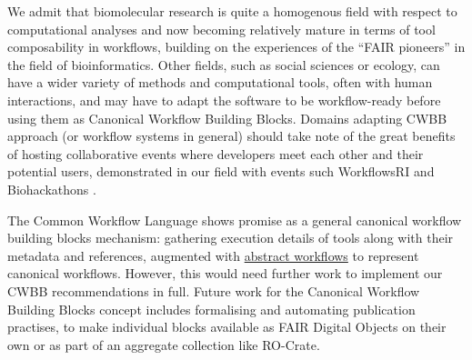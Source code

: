 We admit that biomolecular research is quite a homogenous field with
respect to computational analyses and now becoming relatively mature in
terms of tool composability in workflows, building on the experiences of
the ``FAIR pioneers'' in the field of bioinformatics. Other fields, such
as social sciences or ecology, can have a wider variety of methods and
computational tools, often with human interactions, and may have to
adapt the software to be workflow-ready \cite{ch6-37} before using them as
Canonical Workflow Building Blocks. Domains adapting CWBB approach (or
workflow systems in general) should take note of the great benefits of
hosting collaborative events where developers meet each other and their
potential users, demonstrated in our field with events such WorkflowsRI
\cite{ch6-39} and Biohackathons \cite{ch6-40}.

The Common Workflow Language shows promise as a general canonical
workflow building blocks mechanism: gathering execution details of tools
along with their metadata and references, augmented with
\href{https://docs.bioexcel.eu/cwl-best-practice-guide/devpractice/partial.html\#using-abstract-operations-as-placeholders}{abstract
workflows} to represent canonical workflows. However, this would need
further work to implement our CWBB recommendations in full. Future work
for the Canonical Workflow Building Blocks concept includes formalising
and automating publication practises, to make individual blocks
available as FAIR Digital Objects on their own or as part of an
aggregate collection like RO-Crate.
